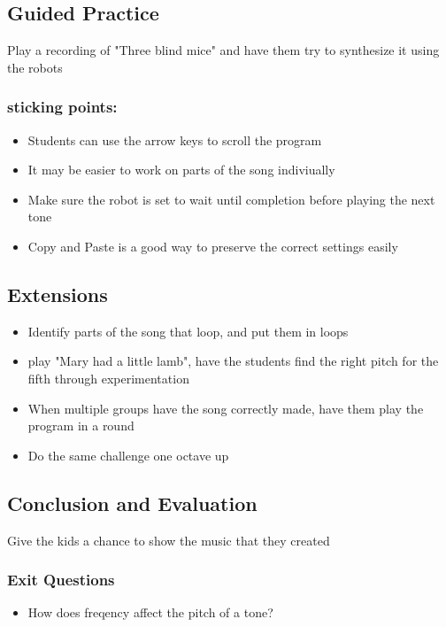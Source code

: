 \documentclass{lessonplan}
\begin{document}
    \subsection{Guided Practice}
      Play a recording of "Three blind mice" and have them try to
      synthesize it using the robots
      \subsubsection{sticking points:}
      \begin{itemize}
        \item Students can use the arrow keys to scroll the program
        \item It may be easier to work on parts of the song
          indiviually
        \item Make sure the robot is set to wait until completion
          before playing the next tone
        \item Copy and Paste is a good way to preserve the correct
          settings easily
      \end{itemize}
    \subsection{Extensions}
      \begin{itemize}
        \item Identify parts of the song that loop, and put them in
          loops
        \item play "Mary had a little lamb", have the students find
          the right pitch for the fifth through experimentation
        \item When multiple groups have the song correctly made, have
          them play the program in a round
        \item Do the same challenge one octave up
      \end{itemize}
    \subsection{Conclusion and Evaluation}
      Give the kids a chance to show the music that they created
      \subsubsection{Exit Questions}
      \begin{itemize}
        \item How does freqency affect the pitch of a tone?
      \end{itemize}
\end{document}

